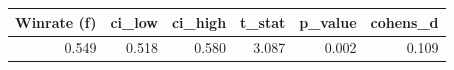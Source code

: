 \begin{tabular}{rrrrrr}
\toprule
Winrate (f) & ci\_low & ci\_high & t\_stat & p\_value & cohens\_d \\
\midrule
0.549 & 0.518 & 0.580 & 3.087 & 0.002 & 0.109 \\
\bottomrule
\end{tabular}
